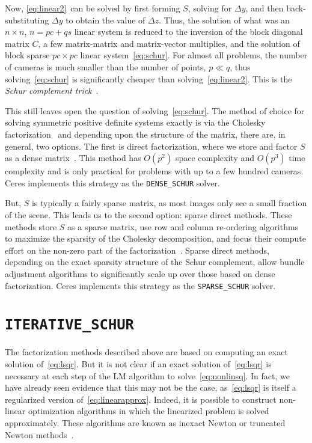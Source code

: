 Now, \eqref{eq:linear2}~can  be solved by first forming $S$, solving for $\Delta y$, and then back-substituting $\Delta y$ to obtain the value of $\Delta z$.
Thus, the solution of what was an $n\times n$, $n=pc+qs$ linear system is reduced to the inversion of the block diagonal matrix $C$, a few matrix-matrix and matrix-vector multiplies, and the solution of block sparse $pc\times pc$ linear system~\eqref{eq:schur}.  For almost all  problems, the number of cameras is much smaller than the number of points, $p \ll q$, thus solving~\eqref{eq:schur} is significantly cheaper than solving~\eqref{eq:linear2}. This is the {\em Schur complement trick}~\cite{brown-58}.

This still leaves open the question of solving~\eqref{eq:schur}. The
method of choice for solving symmetric positive definite systems
exactly is via the Cholesky
factorization~\cite{trefethen1997numerical} and depending upon the
structure of the matrix, there are, in general, two options. The first
is direct factorization, where we store and factor $S$ as a dense
matrix~\cite{trefethen1997numerical}. This method has $O(p^2)$ space complexity and $O(p^3)$ time
complexity and is only practical for problems with up to a few hundred
cameras. Ceres implements this strategy as the \texttt{DENSE\_SCHUR} solver.


 But, $S$ is typically a fairly sparse matrix, as most images
only see a small fraction of the scene. This leads us to the second
option: sparse direct methods. These methods store $S$ as a sparse
matrix, use row and column re-ordering algorithms to maximize the
sparsity of the Cholesky decomposition, and focus their compute effort
on the non-zero part of the factorization~\cite{chen2006acs}.
Sparse direct methods, depending on the exact sparsity structure of the Schur complement,
allow bundle adjustment algorithms to significantly scale up over those based on dense
factorization. Ceres implements this strategy as the \texttt{SPARSE\_SCHUR} solver.


\section{\texttt{ITERATIVE\_SCHUR}}

The factorization methods described above are based on computing an exact solution of~\eqref{eq:lsqr}. But it is not clear if an exact solution of~\eqref{eq:lsqr} is necessary at each step of the LM algorithm to solve~\eqref{eq:nonlinsq}. In fact, we have already seen evidence that this may not be the case, as~\eqref{eq:lsqr} is itself a regularized version of~\eqref{eq:linearapprox}. Indeed, it is possible to construct non-linear optimization algorithms in which the linearized problem is solved approximately. These algorithms are known as inexact Newton or truncated Newton methods~\cite{nocedal2000numerical}.

